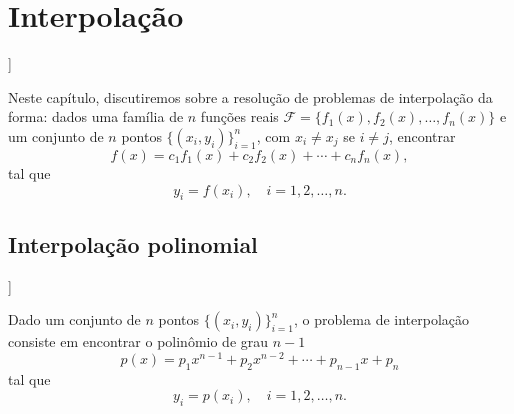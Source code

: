
\chapter{Interpolação}\label{cap_interp}
\thispagestyle{fancy}

\begin{flushleft}
  [[tag:revisar]]
\end{flushleft}

Neste capítulo, discutiremos sobre a resolução de problemas de interpolação da forma: dados uma família de $n$ funções reais $\mathcal{F} = \{f_1(x), f_2(x), \ldots, f_n(x)\}$ e um conjunto de $n$ pontos $\{(x_i, y_i)\}_{i=1}^n$, com $x_i\neq x_j$ se $i\neq j$, encontrar
\begin{equation}
  f(x) = c_1f_1(x) + c_2f_2(x) + \cdots + c_nf_n(x),
\end{equation}
tal que
\begin{equation}
  y_i = f(x_i),\quad i=1, 2, \ldots, n.
\end{equation}

\section{Interpolação polinomial}\label{cap_interp_sec_interpoli}

\begin{flushleft}
  [[tag:revisar]]
\end{flushleft}

Dado um conjunto de $n$ pontos $\{(x_i, y_i)\}_{i=1}^n$, o problema de interpolação consiste em encontrar o polinômio de grau $n-1$
\begin{equation}\label{eq:interpoli_poli}
  p(x) = p_1x^{n-1} + p_2x^{n-2} + \cdots + p_{n-1}x + p_n
\end{equation}
tal que
\begin{equation}\label{eq:interpoli_conds}
  y_i = p(x_i),\quad i=1, 2, \ldots, n.
\end{equation}

